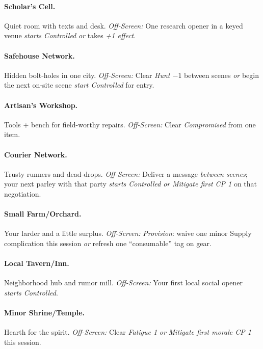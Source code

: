 \documentclass[11pt]{article}
\begin{document}
\paragraph{Scholar’s Cell.} Quiet room with texts and desk.
\emph{Off-Screen:} One research opener in a keyed venue \emph{starts Controlled} \emph{or} takes \emph{+1 effect}.

\paragraph{Safehouse Network.} Hidden bolt-holes in one city.
\emph{Off-Screen:} Clear \emph{Hunt $-1$} between scenes \emph{or} begin the next on-site scene \emph{start Controlled} for entry.

\paragraph{Artisan’s Workshop.} Tools + bench for field-worthy repairs.
\emph{Off-Screen:} Clear \emph{Compromised} from one item.

\paragraph{Courier Network.} Trusty runners and dead-drops.
\emph{Off-Screen:} Deliver a message \emph{between scenes}; your next parley with that party \emph{starts Controlled} \emph{or} \emph{Mitigate first CP 1} on that negotiation.

\paragraph{Small Farm/Orchard.} Your larder and a little surplus.
\emph{Off-Screen:} \emph{Provision}: waive one minor Supply complication this session \emph{or} refresh one “consumable” tag on gear.

\paragraph{Local Tavern/Inn.} Neighborhood hub and rumor mill.
\emph{Off-Screen:} Your first local social opener \emph{starts Controlled}.

\paragraph{Minor Shrine/Temple.} Hearth for the spirit.
\emph{Off-Screen:} Clear \emph{Fatigue 1} \emph{or} \emph{Mitigate first morale CP 1} this session.
\end{document}
